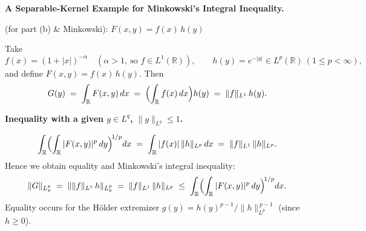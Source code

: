 \begin{problem}[CP-II-0550]
\label{prob:cp-ii-0550}
\textbf{A Separable-Kernel Example for Minkowski's Integral Inequality.}

\hspace*{1.5em}(for part (b) \& Minkowski): \boldmath $F(x,y)=f(x)\,h(y)$

Take
\[
f(x)=(1+|x|)^{-\alpha}\quad (\alpha>1,\ \text{so } f\in L^1(\mathbb{R})),
\qquad
h(y)=e^{-|y|}\in L^p(\mathbb{R})\ (1\le p<\infty),
\]
and define $F(x,y)=f(x)\,h(y)$. Then
\[
G(y) \;=\; \int_{\mathbb{R}} F(x,y)\,dx \;=\; \Bigl(\int_{\mathbb{R}} f(x)\,dx\Bigr) h(y) \;=\; \|f\|_{L^1}\,h(y).
\]

\begin{center}
\end{center}

\par\medskip\noindent\textbf{Inequality with a given $g\in L^q$, $\|g\|_{L^q}\le1$.}\quad
\begin{center}
\end{center}

\[
\int_{\mathbb{R}} \Bigl(\int_{\mathbb{R}} |F(x,y)|^p\,dy\Bigr)^{\!1/p} dx
\;=\; \int_{\mathbb{R}} |f(x)|\,\|h\|_{L^p}\,dx
\;=\; \|f\|_{L^1}\,\|h\|_{L^p}.
\]
Hence we obtain equality and Minkowski's integral inequality:
\[
\|G\|_{L_y^p}
\;=\; \|\|f\|_{L^1}\,h\|_{L_y^p}
\;=\; \|f\|_{L^1}\,\|h\|_{L^p}
\;\le\; \int_{\mathbb{R}} \Bigl(\int_{\mathbb{R}} |F(x,y)|^p\,dy\Bigr)^{\!1/p} dx.
\]
Equality occurs for the Hölder extremizer $g(y)=h(y)^{p-1}/\|h\|_{L^p}^{\,p-1}$ (since $h\ge 0$).

\clearpage
\end{problem}

